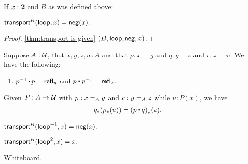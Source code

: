 \documentclass[centering]{report}
\newenvironment{slide}
    {\newpage
    \vspace*{\fill}
    }
    {
     \vspace*{\fill}
    }
\begin{document}
\begin{slide}
If $x : \bool$ and $B$ as was defined above:
\begin{lem}\label{lem0}
  $\transfib{B}{\lloop}{x} = \mathsf{neg}(x).$
\end{lem}
\begin{proof}
  \cref{thm:transport-is-given} $(B, \lloop, \mathsf{neg}, x)$.
\end{proof}

{\color{gray}
\everymath{\color{gray}}
\begin{lem}\label{thm:omg}%
  Suppose $A:\type$, that $x,y,z,w:A$ and that $p:x= y$ and $q:y = z$ and $r:z=w$.
  We have the following:
  \begin{enumerate}
  \item $\opp{p}\ct p=  \refl{y}$ and $p\ct \opp{p}= \refl{x}$.\label{item:omg2}
  \end{enumerate}
\end{lem}


\begin{lem}\label{thm:transport-concat}
  Given $P:A\to\type$ with $p:\id[A]xy$ and $q:\id[A]yz$ while $u:P(x)$, we have
  \begin{align*}
    \trans{q}{\trans{p}{u}} = \trans{(p\ct q)}{u}.
  \end{align*}
\end{lem}
}
\begin{lem}\label{lem1}
  $\transfib{B}{\lloop^{-1}}{x} = \mathsf{neg}(x).$
\end{lem}

\begin{lem}\label{lem2}
$\transfib{B}{\lloop^2}{x} = x.$
\end{lem}
\end{slide}

\begin{slide}
Whiteboard.
\end{slide}
\end{document}
